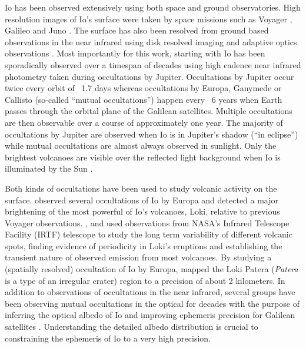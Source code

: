 \documentclass[modern]{aastex62}
\begin{document}
Io has been observed extensively using both space and ground observatories.
High resolution images of Io's surface were taken by space missions such as Voyager \citep{smith1979}, Galileo \citep{belton1996} and Juno \citep{mura2020}.
The surface has also been resolved from ground based observations in the near infrared using disk resolved imaging \citep{howell1985,simonelli1986,spencer1990} and adaptive optics observations \citep{marchis2000,marchis2005,dekleer2016}.
Most importantly for this work,  starting with \cite{spencer1990} Io has been sporadically observed over a timespan of decades using high cadence near infrared photometry taken during occultations by Jupiter.
Occultations by Jupiter occur twice every orbit of ~1.7 days whereas occultations by Europa, Ganymede or Callisto (so-called ``mutual occultations'') happen every ~6 years when Earth passes through the orbital plane of the Galilean satellites.
Multiple occultations are then observable over a course of approximately one year.
The majority of occultations by Jupiter are observed when Io is in Jupiter's shadow (``in eclipse'') while mutual occultations are almost always observed in sunlight.
Only the brightest volcanoes are visible over the reflected light background when Io is illuminated by the Sun \citep{veeder1994,dekleer2016a}.

Both kinds of occultations have been used to study volcanic activity on the surface.
\cite{spencer1994} observed several occultations of Io by Europa and detected a major brightening of the most powerful of Io's volcanoes, Loki, relative to previous Voyager observations.
\cite{rathbun2002},\citet{rathbun2006} and \citet{rathbun2010} used observations from NASA's 
Infrared Telescope Facility (IRTF) telescope to study the long term variability of different volcanic spots, finding evidence of periodicity in Loki's eruptions and establishing the transient nature of observed emission from most volcanoes. 
By studying a (spatially resolved) occultation of Io by Europa, \cite{dekleer2017} mapped the Loki Patera (\emph{Patera} is a type of an irregular crater) region to a precision of about 2 kilometers.
In addition to observations of occultations in the near infrared, several groups have been observing mutual occultations in the optical for decades with the purpose of inferring the optical albedo of Io and improving ephemeris precision for Galilean satellites \citep[][and references therein]{arlot1974,saquet2018,morgado2016a}.
Understanding the detailed albedo distribution is crucial to constraining the ephemeris of Io to a very high precision.
\end{document}
